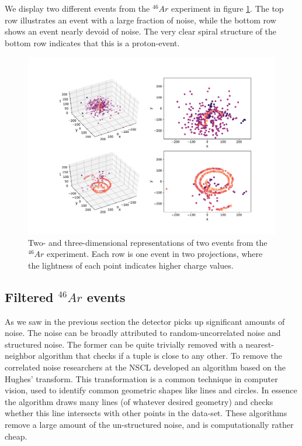 We display two different events from the ${}^{46}Ar$ experiment in figure \ref{fig:samples}. The top row illustrates an event with a large fraction of noise, while the bottom row shows an event nearly devoid of noise. The very clear spiral structure of the bottom row indicates that this is a proton-event.

\begin{figure}[H]
\centering
\includegraphics[width=\textwidth]{../plots/display_eventsfull_.pdf}
\caption[Displaying un-filtered events in 2D and 3D]{Two- and three-dimensional representations of two events from the ${}^{46}Ar$ experiment. Each row is one event in two projections, where the lightness of each point indicates higher charge values.}\label{fig:samples}
\end{figure}

\subsection{Filtered \texorpdfstring{${}^{46}Ar$}{46Ar} events}\label{sec:filtered}

As we saw in the previous section the detector picks up significant amounts of noise. The noise can be broadly attributed to random-uncorrelated noise and structured noise. The former can be quite trivially removed with a nearest-neighbor algorithm that checks if a tuple is close to any other. To remove the correlated noise researchers at the NSCL developed an algorithm based on the Hughes' transform. This transformation is a common technique in computer vision, used to identify common geometric shapes like lines and circles. In essence the algorithm draws many lines (of whatever desired geometry) and checks whether this line intersects with other points in the data-set. These algorithms remove a large amount of the un-structured noise, and is computationally rather cheap.

